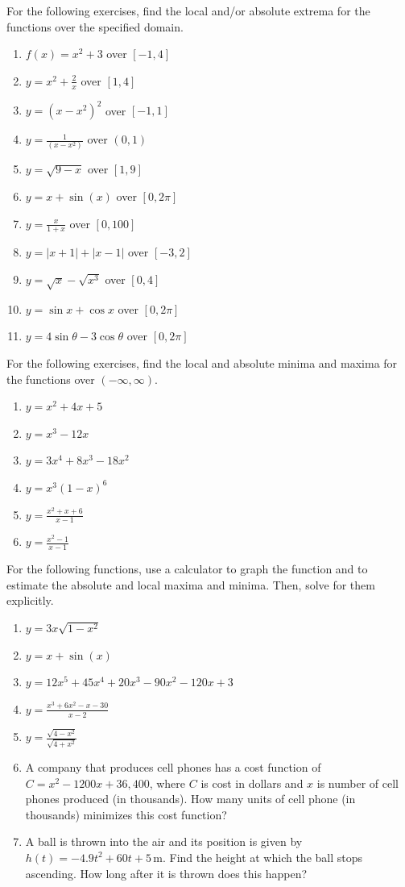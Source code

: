 \documentclass{exercises}
\begin{document}
For the following exercises, find the local and/or absolute extrema for the functions over the specified domain.

\begin{enumerate}[resume]
\item $f(x)=x^{2}+3$ over $[-1,4]$
\item $y=x^{2}+\frac{2}{x}$ over $[1,4]$
\item $y={(x-x^{2})}^{2}$ over $[-1,1]$
\item $y=\frac{1}{(x-x^{2})}$ over $(0,1)$
\item $y=\sqrt{9-x}$ over $[1,9]$
\item $y=x+\sin(x)$ over $[0,2\pi]$
\item $y=\frac{x}{1+x}$ over $[0,100]$
\item $y=|x+1|+|x-1|$ over $[-3,2]$
\item $y=\sqrt{x}-\sqrt{x^{3}}$ over $[0,4]$
\item $y=\sin x+\cos x$ over $[0,2\pi]$
\item $y=4\sin \theta-3\cos \theta$ over $[0,2\pi]$
\end{enumerate}

For the following exercises, find the local and absolute minima and maxima for the functions over $(-\infty,\infty)$.

\begin{enumerate}[resume]
\item $y=x^{2}+4x+5$
\item $y=x^{3}-12x$
\item $y=3x^{4}+8x^{3}-18x^{2}$
\item $y=x^{3}{(1-x)}^{6}$
\item $y=\frac{x^{2}+x+6}{x-1}$
\item $y=\frac{x^{2}-1}{x-1}$
\end{enumerate}

For the following functions, use a calculator to graph the function and to estimate the absolute and local maxima and minima. Then, solve for them explicitly.

\begin{enumerate}[resume]
\item \techrequired $y=3x\sqrt{1-x^{2}}$
\item \techrequired $y=x+\sin(x)$
\item \techrequired $y=12x^{5}+45x^{4}+20x^{3}-90x^{2}-120x+3$
\item \techrequired $y=\frac{x^{3}+6x^{2}-x-30}{x-2}$
\item \techrequired $y=\frac{\sqrt{4-x^{2}}}{\sqrt{4+x^{2}}}$
\item A company that produces cell phones has a cost function of $C=x^{2}-1200x+36{,}400$, where $C$ is cost in dollars and $x$ is number of cell phones produced (in thousands). How many units of cell phone (in thousands) minimizes this cost function?
\item A ball is thrown into the air and its position is given by $h(t)=-4.9t^{2}+60t+5\,\text{m}$. Find the height at which the ball stops ascending. How long after it is thrown does this happen?
\end{enumerate}
\end{document}
